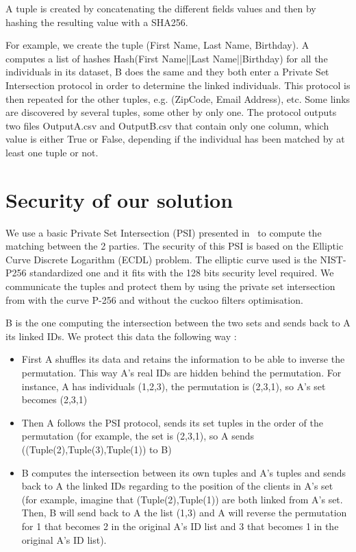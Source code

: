\documentclass{article}
\begin{document}
A tuple is created by concatenating the different fields values and then by hashing the resulting value with a SHA256.

For example, we create the tuple (First Name, Last Name, Birthday). A computes a list of hashes Hash(First Name||Last Name||Birthday) for all the individuals in its dataset, B does the same and they both enter a Private Set Intersection protocol in order to determine the linked individuals. This protocol is then repeated for the other tuples, e.g. (ZipCode, Email Address), etc. Some links are discovered by several tuples, some other by only one. The protocol outputs two files OutputA.csv and OutputB.csv that contain only one column, which value is either True or False, depending if the individual has been matched by at least one tuple or not.

\section{Security of our solution}
We use a basic Private Set Intersection (PSI) presented in~\cite{cryptoeprint:2017/677} to compute the matching between the 2 parties. The security of this PSI is based on the Elliptic Curve Discrete Logarithm (ECDL) problem. The elliptic curve used is the NIST-P256 standardized one and it fits with the 128 bits security level required.
We communicate the tuples and protect them by using the private set intersection from \cite{cryptoeprint:2017/677} with the curve P-256 and without the cuckoo filters optimisation.

B is the one computing the intersection between the two sets and sends back to A its linked IDs. We protect this data the following way :\\
\begin{itemize}
\item First A shuffles its data and retains the information to be able to inverse the permutation. This way A's real IDs are hidden behind the permutation. For instance, A has individuals (1,2,3), the permutation is (2,3,1), so A's set becomes (2,3,1)\\
\item Then A follows the PSI protocol, sends its set tuples in the order of the permutation
(for example, the set is (2,3,1), so A sends ((Tuple(2),Tuple(3),Tuple(1)) to B)\\
\item B computes the intersection between its own tuples and A's tuples and sends back to A the linked IDs regarding to the position of the clients in A's set
(for example, imagine that (Tuple(2),Tuple(1)) are both linked from A's set. Then, B will send back to A the list (1,3) and A will reverse the permutation for 1 that becomes 2 in the original A's ID list and 3 that becomes 1 in the original A's ID list).\\
\end{itemize}
\end{document}
